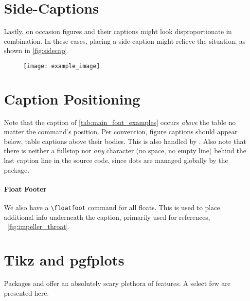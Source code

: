 \section{Side-Captions}
Lastly, on occasion figures and their captions might look disproportionate in combination.
In these cases, placing a side-caption might relieve the situation, as shown in \cref{fig:sidecap}.
\begin{figure}
%
{%
	\texttt{[image: example\_image]}%
}%
\end{figure}
\section{Caption Positioning}
Note that the caption of \cref{tab:main_font_examples} occurs \textit{above} the table no matter the  command's position.
Per convention, figure captions should appear below, table captions above their bodies.
This is also handled by .
Also note that there is neither a fullstop nor \textit{any} character (no space, no empty line) behind the last caption line in the source code, since dots are managed globally by the  package.
\paragraph{Float Footer}
We also have a \verb|\floatfoot| command for all floats.
This is used to place additional info underneath the caption, primarily used for references, \ \cref{fig:impeller_throat}.
\section{Tikz and pgfplots}
Packages  and  offer an absolutely scary plethora of features.
A select few are presented here.
